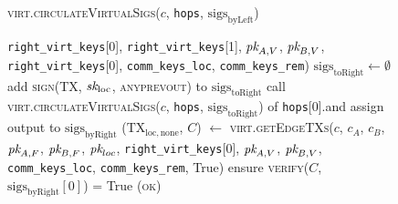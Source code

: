 \begin{figure}[H]
\begin{processbox}{\textsc{virt.circulateVirtualSigs}($c$, \texttt{hops},
  $\mathrm{sigs}_{\mathrm{byLeft}}$)}
\begin{algorithmic}[1]
        \texttt{right\_virt\_keys}[0], \texttt{right\_virt\_keys}[1], $\textit{pk}_{A,
        V}$, $\textit{pk}_{B, V}$, \texttt{right\_virt\_keys}[0],
        \texttt{comm\_keys\_loc}, \texttt{comm\_keys\_rem})
        \State $\mathrm{sigs}_{\mathrm{toRight}} \gets \emptyset$
          \State add \textsc{sign}(TX, $\textit{sk}_{\mathrm{loc}}$, \textsc{anyprevout})
          to $\mathrm{sigs}_{\mathrm{toRight}}$
        \EndFor
        \State call \textsc{virt.circulateVirtualSigs}($c$, \texttt{hops},
        $\mathrm{sigs}_{\mathrm{toRight}}$) of \texttt{hops}[0].\bob and
        assign output to $\mathrm{sigs}_{\mathrm{byRight}}$
        \State ($\mathrm{TX}_{\mathrm{loc}, \mathrm{none}}$, $C$) $\gets$
        \textsc{virt.getEdgeTXs}($c$, $c_A$, $c_B$, $\textit{pk}_{A, F}$, $\textit{pk}_{B, F}$,
        $\textit{pk}_{loc}$, \texttt{right\_virt\_keys}[0], $\textit{pk}_{A, V}$, $\textit{pk}_{B, V}$,
        \texttt{comm\_keys\_loc}, \texttt{comm\_keys\_rem}, True)
        \State ensure \textsc{verify}($C$,
        $\mathrm{sigs}_{\mathrm{byRight}}[0]$) = True
        \State \Return (\textsc{ok})
      \EndIf
    \end{algorithmic}
  \end{processbox}
  \caption{}
  \label{code:virtual-layer:virtual-sigs}
\end{figure}

